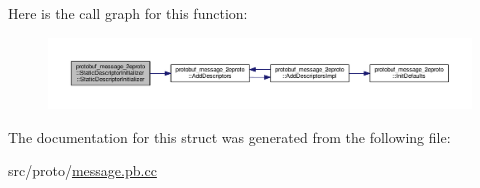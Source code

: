 Here is the call graph for this function\+:
\nopagebreak
\begin{figure}[H]
\begin{center}
\leavevmode
\includegraphics[width=350pt]{structprotobuf__message__2eproto_1_1_static_descriptor_initializer_a78564963a7f453ebca8ef30cf8bfa8aa_cgraph}
\end{center}
\end{figure}




The documentation for this struct was generated from the following file\+:\begin{DoxyCompactItemize}
\item 
src/proto/\hyperlink{message_8pb_8cc}{message.\+pb.\+cc}\end{DoxyCompactItemize}
